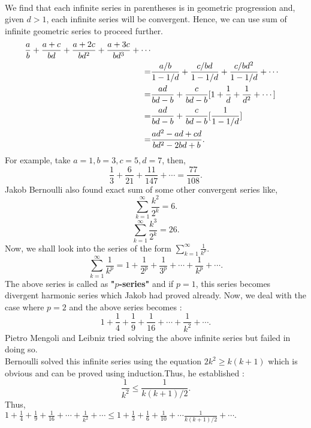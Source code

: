 \documentclass[a4paper,reqno,11pt]{book}
\theoremstyle{plain}%
\theoremstyle{definition}
\begin{document}
  \\
We find that each infinite series in parentheses is in geometric progression and, given $d > 1$, each infinite series will be convergent. Hence, we can use sum of infinite geometric series to proceed further.\\
\begin{align*}
\frac{a}{b} + \frac{a+c}{bd} + \frac{a+2c}{bd^2} + \frac{a+3c}{bd^3} + \cdots\\
\indent =& \frac{a/b}{1-1/d} + \frac{c/bd}{1-1/d} + \frac{c/bd^2}{1-1/d} + \cdots\\
\indent =& \frac{ad}{bd-b} + \frac{c}{bd-b}[1 + \frac{1}{d} + \frac{1}{d^2} + \cdots] \\
\indent =& \frac{ad}{bd-b} + \frac{c}{bd-b}[\frac{1}{1-1/d}] \\
\indent =& \frac{ad^2 - ad + cd}{bd^2 - 2bd + b}.\\
\end{align*}
For example, take $a = 1, b = 3, c = 5, d = 7$, then,\\
$$\frac{1}{3} + \frac{6}{21} + \frac{11}{147} + \cdots = \frac{77}{108}.$$
Jakob Bernoulli also found exact sum of some other convergent series like,\\
$$\sum_{k=1}^{\infty}\frac{k^2}{2^k} = 6.$$
$$\sum_{k=1}^{\infty}\frac{k^3}{2^k} = 26.$$
Now, we shall look into the series of the form $\sum_{k=1}^{\infty}\frac{1}{k^p}$.\\
$$\sum_{k=1}^{\infty}\frac{1}{k^p} = 1 + \frac{1}{2^{p}} + \frac{1}{3^p} + \cdots + \frac{1}{k^p} + \cdots.$$
The above series is called as \textbf{"$p$-series"} and if $p=1$, this series becomes divergent harmonic series which Jakob had proved already. Now, we deal with the case where $p=2$ and the above series becomes :\\
$$ 1 + \frac{1}{4} + \frac{1}{9} + \frac{1}{16} + \cdots + \frac{1}{k^2} + \cdots .$$
Pietro Mengoli and Leibniz tried solving the above infinite series but failed in doing so.\\
Bernoulli solved this infinite series using the equation $2k^2 \geq k(k+1)$ which is obvious and can be proved using induction.Thus, he established :\\
$$ \frac{1}{k^2} \leq \frac{1}{k(k+1)/2}. $$
Thus,\\
$ 1 + \frac{1}{4} + \frac{1}{9} + \frac{1}{16} + \cdots + \frac{1}{k^2} + \cdots \leq 1 + \frac{1}{3} + \frac{1}{6} + \frac{1}{10} + \cdots \frac{1}{k(k+1)/2} + \cdots.$\\
\\
\end{document}
